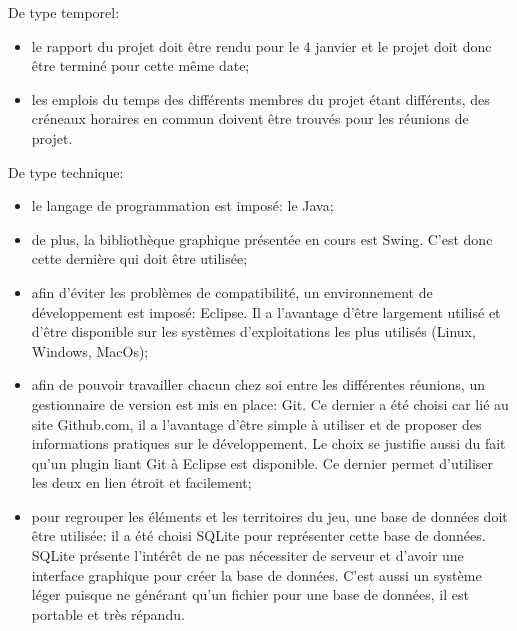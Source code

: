 \documentclass[a4paper, 11pt]{article}
\begin{document}
		De type temporel: 
		\begin{itemize}
			\item le rapport du projet doit être rendu pour le 4 janvier et le projet doit donc être terminé pour cette même date;
			\item les emplois du temps des différents membres du projet étant différents, des créneaux horaires en commun doivent être trouvés pour les réunions de projet. \\
		\end{itemize}
		
		De type technique:
		\begin{itemize}
			\item le langage de programmation est imposé: le Java;
			\item de plus, la bibliothèque graphique présentée en cours est Swing. C'est donc cette dernière qui doit être utilisée;
			\item afin d'éviter les problèmes de compatibilité, un environnement de développement est imposé: Eclipse. Il a l'avantage d'être largement utilisé et d'être disponible sur les systèmes d'exploitations les plus utilisés (Linux, Windows, MacOs);
			\item afin de pouvoir travailler chacun chez soi entre les différentes réunions, un gestionnaire de version est mis en place: Git. Ce dernier a été choisi car lié au site Github.com, il a l'avantage d'être simple à utiliser et de proposer des informations pratiques sur le développement. Le choix se justifie aussi du fait qu'un plugin liant Git à Eclipse est disponible. Ce dernier permet d'utiliser les deux en lien étroit et facilement;
			\item pour regrouper les éléments et les territoires du jeu, une base de données doit être utilisée: il a été choisi SQLite pour représenter cette base de données. SQLite présente l'intérêt de ne pas nécessiter de serveur et d'avoir une interface graphique pour créer la base de données. C'est aussi un système léger puisque ne générant qu'un fichier pour une base de données, il est portable et très répandu.
		\end{itemize}
		
\end{document}
